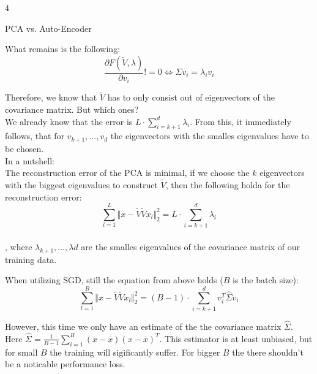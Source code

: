 \documentclass{article}
\begin{document}
\begin{ukon-infie}[28.1.18]{4}
\begin{exercise}[p=20]{PCA vs. Auto-Encoder}
{			What remains is the following:\\
			$$\frac{\partial F(\tilde{V}, \lambda)}{\partial v_i} != 0 \Leftrightarrow \Sigma v_i = \lambda_i v_i$$
			
			Therefore, we know that $\tilde{V}$ has to only consist out of eigenvectors of the covariance matrix. But which ones?\\
			We already know that the error is  $L \cdot \sum_{i=k+1}^d\lambda_i$. From this, it immediately follows, that for $v_{k+1}, \dots, v_{d}$ the eigenvectors with the smalles eigenvalues have to be chosen.\\
			
			In a nutshell:\\
			
			The reconstruction error of the PCA is minimal, if we choose the $k$ eigenvectors with the biggest eigenvalues to construct $\tilde{V}$, then the following holda for the reconstruction error:\\
			$$\sum_{l=1}^L \Vert x - \tilde{V}\tilde{V}x_l \Vert_2^2 = L \cdot \sum_{i=k+1}^d\lambda_i$$ \\
			, where $\lambda_{k+1}, \dots, \lambda{d}$ are the smalles eigenvalues of the covariance matrix of our training data.
		}
		\question{}
		{
			When utilizing SGD, still the equation from above holds ($B$ is the batch size): \\
			$$\sum_{l=1}^B \Vert x - \tilde{V}\tilde{V}x_l \Vert_2^2 = (B-1) \cdot \sum_{i=k+1}^dv_i^T \hat{\Sigma} v_i$$
			
			However, this time we only have an estimate of the the covariance matrix $\hat{\Sigma}$. \\
			Here $\hat{\Sigma} = \frac{1}{B-1} \sum_{i=1}^B(x- \overline{x})(x-\overline{x})^T$. This estimator is at least unbiased, but for small $B$ the training will sigificantly suffer. For bigger $B$ the there shouldn't be a noticable performance loss.
		}
		
		\end{exercise}

\end{ukon-infie}
\end{document}

